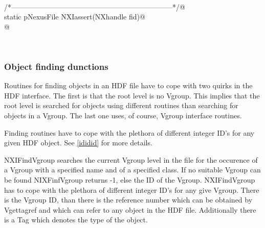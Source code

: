 \documentclass[12pt]{article}
\begin{document}
\begin{flushleft} \small
\begin{minipage}{\linewidth} \label{scrap29}
\vspace{-1ex}
\begin{list}{}{} \item
\mbox{}\verb@@\\
\mbox{}\verb@/*--------------------------------------------------------------------*/@\\
\mbox{}\verb@   static pNexusFile NXIassert(NXhandle fid)@\\
\mbox{}@\\
\end{list}
\vspace{-1ex}
\footnotesize\addtolength{\baselineskip}{-1ex}
\end{minipage}\\[4ex]
\end{flushleft}
\subsubsection{ Object finding dunctions}

Routines for finding objects in an HDF file have to cope with two quirks in
the HDF interface. The first is that the root level is no Vgroup. This
implies that the root level is searched for objects using different routines
than searching for objects in a Vgroup. The last one uses, of course, Vgroup
interface routines.

Finding routines have  to cope with the plethora of different integer
ID's for any given HDF object. See \ref{ididid} for more details. 


NXIFindVgroup searches the current Vgroup level in the file for the
occurence of a Vgroup with a specified name and of a specified class. If no
suitable Vgroup can be found NIXFinfVgroup returns -1, else the ID of the
Vgroup. 
NXIFindVgroup has to cope with the plethora of different integer
ID's for any give Vgroup. There is the Vgroup ID, than there is the
reference number which can be obtained by Vgettagref and which can refer to
any object in the HDF file. Additionally there is a Tag which denotes the
type of the object.  
\end{document}
